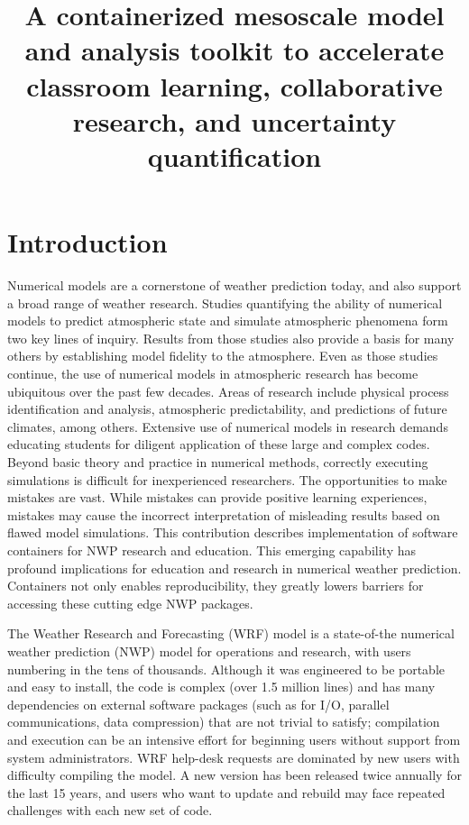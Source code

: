 \documentclass[draft]{ametsoc}
\title{A containerized mesoscale model and analysis toolkit to accelerate classroom learning,
collaborative research, and uncertainty quantification}
\affiliation{Research Applications Laboratory, National Center for Atmospheric Research, Boulder, CO.}
\begin{document}
\maketitle


%

\section{Introduction}

Numerical models are a cornerstone of weather prediction today, and also support a broad range of weather research. Studies quantifying the ability of numerical models to predict atmospheric state and simulate atmospheric phenomena form two key lines of inquiry. Results from those studies also provide a basis for many others by establishing model fidelity to the atmosphere. Even as those studies continue, the use of numerical models in atmospheric research has become ubiquitous over the past few decades. Areas of research include physical process identification and analysis, atmospheric predictability, and predictions of future climates, among others.  Extensive use of numerical models in research demands educating students for diligent application of these large and complex codes. Beyond basic theory and practice in numerical methods, correctly executing simulations is difficult for inexperienced researchers. The opportunities to make mistakes are vast.  While mistakes can provide positive learning experiences, mistakes may cause the incorrect interpretation of misleading results based on flawed model simulations.  This contribution describes implementation of software containers for NWP research and education. This emerging capability has profound implications for education and research in numerical weather prediction. Containers not only enables reproducibility, they greatly lowers barriers for accessing these cutting edge NWP packages. 

The Weather Research and Forecasting (WRF) model \citep{Skamarock:08} is a state-of-the numerical weather prediction (NWP) model for operations and research, with users numbering in the tens of thousands. Although it was engineered to be portable and easy to install, the code is complex (over 1.5 million lines) and has many dependencies on external software packages (such as for I/O, parallel communications, data compression) that are not trivial to satisfy; compilation and execution can be an intensive effort for beginning users without support from system administrators. WRF help-desk requests are dominated by new users with difficulty compiling the model. A new version has been released twice annually for the last 15 years, and users who want to update and rebuild may face repeated challenges with each new set of code. 
\end{document}
